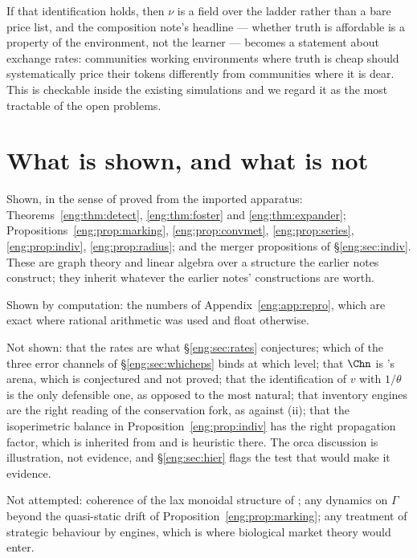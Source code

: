 If that identification holds, then $\nu$ is a field over the ladder rather
than a bare price list, and the composition note's headline --- whether
truth is affordable is a property of the environment, not the learner ---
becomes a statement about exchange rates: communities working environments
where truth is cheap should systematically price their tokens differently
from communities where it is dear. This is checkable inside the existing
simulations and we regard it as the most tractable of the open problems.

\section{What is shown, and what is not}\label{eng:S13}

Shown, in the sense of proved from the imported apparatus:
Theorems~\ref{eng:thm:detect}, \ref{eng:thm:foster} and \ref{eng:thm:expander};
Propositions~\ref{eng:prop:marking}, \ref{eng:prop:convmet}, \ref{eng:prop:series},
\ref{eng:prop:indiv}, \ref{eng:prop:radius}; and the merger propositions of
\S\ref{eng:sec:indiv}. These are graph theory and linear algebra over a
structure the earlier notes construct; they inherit whatever the earlier
notes' constructions are worth.

Shown by computation: the numbers of Appendix~\ref{eng:app:repro}, which are
exact where rational arithmetic was used and float otherwise.

Not shown: that the rates are what \S\ref{eng:sec:rates} conjectures; which of
the three error channels of \S\ref{eng:sec:whicheps} binds at which level;
that $\Chn$ is \chComp's arena, which is
conjectured and not proved; that the
identification of $v$ with $1/\theta$ is the only defensible one, as
opposed to the most natural; that inventory engines are the right reading
of the conservation fork, as against (ii); that the isoperimetric balance
in Proposition~\ref{eng:prop:indiv} has the right propagation factor, which is
inherited from \cite{compaut} and is heuristic there. The orca discussion
is illustration, not evidence, and \S\ref{eng:sec:hier} flags the test that
would make it evidence.

Not attempted: coherence of the lax monoidal structure of \chComp;
any dynamics on $\Gamma$ beyond the quasi-static drift of
Proposition~\ref{eng:prop:marking}; any treatment of strategic behaviour by
engines, which is where biological market theory \cite{noe} would enter.

